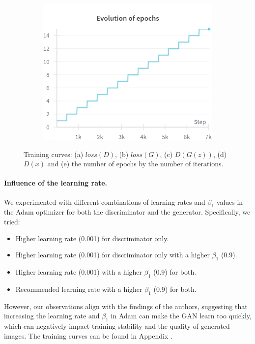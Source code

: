 \begin{figure}[H]
    \begin{subfigure}{0.45\textwidth}
        \centering
        \includegraphics[width=0.95\linewidth]{init/epochs.png}
        \caption{}
        \label{subfig:init/epochs}
    \end{subfigure}%

    \caption{Training curves: (a) $loss(D)$, (b) $loss(G)$, (c) $D(G(z))$, (d) $D(x)$ and (e) the number of epochs by the number of iterations.}
    \label{fig:init_losses}
\end{figure}

\paragraph*{Influence of the learning rate.} We experimented with different combinations of learning rates and $\beta_1$ values in the Adam optimizer for both the discriminator and the generator. Specifically, we tried:

\begin{itemize}
    \item Higher learning rate (0.001) for discriminator only.
    \item Higher learning rate (0.001) for discriminator only with a higher $\beta_1$ (0.9).
    \item Higher learning rate (0.001) with a higher $\beta_1$ (0.9) for both.
    \item Recommended learning rate with a higher $\beta_1$ (0.9) for both.
\end{itemize}

However, our observations align with the findings of the authors, suggesting that increasing the learning rate and $\beta_1$ in Adam can make the GAN learn too quickly, which can negatively impact training stability and the quality of generated images. The training curves can be found in Appendix . 

